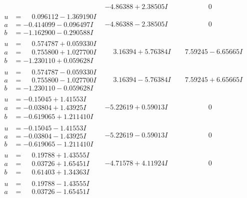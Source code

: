 \documentclass[1p]{elsarticle_modified}
\theoremstyle{definition}
\begin{document}
$$\begin{array}{c|c|c}
 & -4.86388 + 2.38505 I & \phantom{-0.000000 } 0 \\ \hline\begin{aligned}
u &= \phantom{-}0.096112 - 1.369190 I \\
a &= -0.414099 - 0.096497 I \\
b &= -1.162900 - 0.290588 I\end{aligned}
 & -4.86388 - 2.38505 I & \phantom{-0.000000 } 0 \\ \hline\begin{aligned}
u &= \phantom{-}0.574787 + 0.059330 I \\
a &= \phantom{-}0.755800 + 1.027700 I \\
b &= -1.230110 + 0.059628 I\end{aligned}
 & \phantom{-}3.16394 + 5.76384 I & \phantom{-}7.59245 - 6.65665 I \\ \hline\begin{aligned}
u &= \phantom{-}0.574787 - 0.059330 I \\
a &= \phantom{-}0.755800 - 1.027700 I \\
b &= -1.230110 - 0.059628 I\end{aligned}
 & \phantom{-}3.16394 - 5.76384 I & \phantom{-}7.59245 + 6.65665 I \\ \hline\begin{aligned}
u &= -0.15045 + 1.41553 I \\
a &= -0.03804 + 1.43925 I \\
b &= -0.619065 + 1.211410 I\end{aligned}
 & -5.22619 + 0.59013 I & \phantom{-0.000000 } 0 \\ \hline\begin{aligned}
u &= -0.15045 - 1.41553 I \\
a &= -0.03804 - 1.43925 I \\
b &= -0.619065 - 1.211410 I\end{aligned}
 & -5.22619 - 0.59013 I & \phantom{-0.000000 } 0 \\ \hline\begin{aligned}
u &= \phantom{-}0.19788 + 1.43555 I \\
a &= \phantom{-}0.03726 + 1.65451 I \\
b &= \phantom{-}0.61403 + 1.34363 I\end{aligned}
 & -4.71578 + 4.11924 I & \phantom{-0.000000 } 0 \\ \hline\begin{aligned}
u &= \phantom{-}0.19788 - 1.43555 I \\
a &= \phantom{-}0.03726 - 1.65451 I \\

\end{aligned}
\end{array}$$
\end{document}
